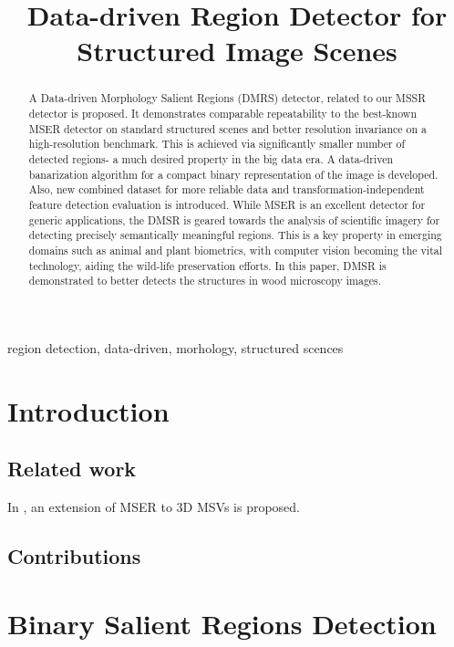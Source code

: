 \documentclass{article}
\title{Data-driven Region Detector for Structured Image Scenes}
\begin{document}
%
\maketitle
%
\begin{abstract}
A Data-driven Morphology Salient Regions (DMRS) detector, related to our MSSR detector is proposed.
It demonstrates comparable repeatability to the best-known MSER detector on standard structured scenes and better resolution invariance on a high-resolution benchmark. This is achieved via significantly smaller number of detected regions- a much desired property in the big data era. A data-driven banarization algorithm for a compact binary representation of the image is developed.  Also, new combined dataset for more reliable data and transformation-independent feature detection evaluation is introduced.
While MSER is an excellent detector for generic applications, the DMSR is geared towards the analysis of scientific imagery for detecting precisely semantically meaningful regions. This is a key property in emerging domains such as animal and plant biometrics, with computer vision becoming the vital technology, aiding the wild-life preservation efforts. In this paper, DMSR is demonstrated to better detects the structures in wood microscopy images.

\end{abstract}
%
\begin{keywords}
region detection, data-driven, morhology, structured scences
\end{keywords}
%
\section{Introduction}
\label{sec:intro}

\subsection{Related work}
\label{ssec:relwork}
In \cite{DonoserB06}, an extension of MSER to 3D MSVs is proposed.
\subsection{Contributions}
\label{ssec:contr}


\section{Binary Salient Regions Detection}
\label{sec:binary}
\end{document}
